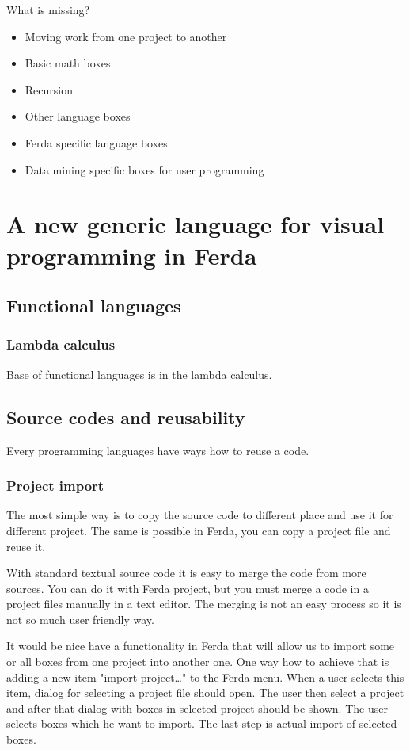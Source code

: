 \documentclass[a4paper,12pt]{book}
\begin{document}
What is missing?
\begin{itemize}
	\item Moving work from one project to another
	\item Basic math boxes
	\item Recursion
	\item Other language boxes
	\item Ferda specific language boxes
	\item Data mining specific boxes for user programming
\end{itemize}

\chapter{A new generic language for visual programming in Ferda}
\section{Functional languages}

\subsection{Lambda calculus}
Base of functional languages is in the lambda calculus. 

\section{Source codes and reusability}
Every programming languages have ways how to reuse a code. 

\subsection{Project import}
The most simple way is to copy the source code to different place and use it for different project. The same is possible in Ferda, you can copy a project file and reuse it.

With standard textual source code it is easy to merge the code from more sources. You can do it with Ferda project, but you must merge a code in a project files manually in a text editor. The merging is not an easy process so it is not so much user friendly way.

It would be nice have a functionality in Ferda that will allow us to import some or all boxes from one project into another one. One way how to achieve that is adding a new item "import project\dots" to the Ferda menu. When a user selects this item, dialog for selecting a project file should open. The user then select a project and after that dialog with boxes in selected project should be shown. The user selects boxes which he want to import. The last step is actual import of selected boxes.
\end{document}
